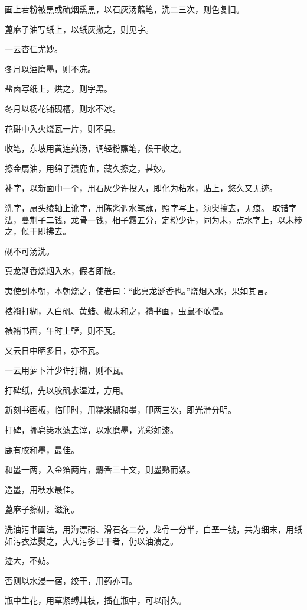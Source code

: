\documentclass[a4paper,12pt,UTF8,twoside]{ctexbook}
\begin{document}
    画上若粉被黑或硫烟熏黑，以石灰汤蘸笔，洗二三次，则色复旧。
    
    蓖麻子油写纸上，以纸灰撤之，则见字。
    
    一云杏仁尤妙。
    
    冬月以酒磨墨，则不冻。
    
    盐卤写纸上，烘之，则字黑。
    
    冬月以杨花铺砚槽，则水不冰。
    
    花硑中入火烧瓦一片，则不臭。
    
    收笔，东坡用黄连煎汤，调轻粉蘸笔，候干收之。
    
    擦金扇油，用绵子渍鹿血，藏久擦之，甚妙。
    
    补字，以新面巾一个，用石灰少许投入，即化为粘水，贴上，悠久又无迹。
    
    洗字，扇头绫轴上讹字，用陈酱调水笔蘸，照字写上，须臾擦去，无痕。 取错字法，蔓荆子二钱，龙骨一钱，相子霜五分，定粉少许，同为末，点水字上，以末糁之，候干即拂去。
    
    砚不可汤洗。
    
    真龙涎香烧烟入水，假者即散。
    
    夷使到本朝，本朝烧之，使者曰：“此真龙涎香也。”烧烟入水，果如其言。
    
    裱褙打糊，入白矾、黄蜡、椒末和之，褙书画，虫鼠不敢侵。
    
    裱褙书画，午时上壁，则不瓦。
    
    又云日中晒多日，亦不瓦。
    
    一云用萝卜汁少许打糊，则不瓦。
    
    打碑纸，先以胶矾水湿过，方用。
    
    新刻书画板，临印时，用糯米糊和墨，印两三次，即光滑分明。
    
    打碑，挪皂筴水滤去滓，以水磨墨，光彩如漆。
    
    鹿有胶和墨，最佳。
    
    和墨一两，入金箔两片，麝香三十文，则墨熟而紧。
    
    造墨，用秋水最佳。
    
    蓖麻子擦研，滋润。
    
    洗油污书画法，用海漂硝、滑石各二分，龙骨一分半，白垩一钱，共为细末，用纸如污衣法熨之，大凡污多已干者，仍以油渍之。
    
    迹大，不妨。
    
    否则以水浸一宿，绞干，用药亦可。
    
    瓶中生花，用草紧缚其枝，插在瓶中，可以耐久。
    
\end{document}

